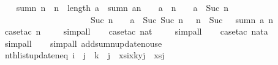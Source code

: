 \begin{isabellebody}
\ \ \isamarkupfalse%
%
\endisatagproof
{\isafoldproof}%
%
\isadelimproof
\isanewline
%
\endisadelimproof
\isanewline
\isanewline
{}\isamarkupfalse%
\ sumn{}{\isacharcolon}\ {\isachardoublequoteopen}n{\isasymge}{}\ {\isasymLongrightarrow}\ n\ {\isasymle}\ length\ a\ {\isasymLongrightarrow}\ sumn\ {\isacharparenleft}a{\isacharbrackleft}n\ {\isacharminus}\ {}\ {\isacharcolon}{\isacharequal}\ a\ {\isacharbang}\ {\isacharparenleft}n\ {\isacharminus}\ {}{\isacharparenright}\ {\isacharplus}\ a\ {\isacharbang}\ Suc\ {\isacharparenleft}n\ {\isacharminus}\ {}{\isacharparenright}{\isacharcomma}\isanewline
\ \ \ \ \ \ \ \ \ \ \ \ \ \ \ \ \ \ \ \ \ Suc\ {\isacharparenleft}n\ {\isacharminus}\ {}{\isacharparenright}\ {\isacharcolon}{\isacharequal}\ a\ {\isacharbang}\ Suc\ {\isacharparenleft}Suc\ {\isacharparenleft}n\ {\isacharminus}\ {}{\isacharparenright}{\isacharparenright}{\isacharbrackright}{\isacharparenright}\ {\isacharparenleft}n\ {\isacharminus}\ Suc\ {}{\isacharparenright}\ {\isacharequal}\ sumn\ a\ n{\isachardoublequoteclose}\isanewline
%
\isadelimproof
\ \ %
\endisadelimproof
%
\isatagproof
{}\isamarkupfalse%
\ {\isacharparenleft}case{\isacharunderscore}tac\ n{\isacharparenright}\isanewline
\ \ \ \isamarkupfalse%
\ simp{\isacharunderscore}all\isanewline
\ \ \isamarkupfalse%
\ {\isacharparenleft}case{\isacharunderscore}tac\ nat{\isacharparenright}\isanewline
\ \ \ \isamarkupfalse%
\ {\isacharparenleft}simp{\isacharunderscore}all{\isacharparenright}\isanewline
\ \ \isamarkupfalse%
\ {\isacharparenleft}case{\isacharunderscore}tac\ nata{\isacharparenright}\isanewline
\ \ \ \isamarkupfalse%
\ {\isacharparenleft}simp{\isacharunderscore}all{\isacharparenright}\isanewline
\ \ \isamarkupfalse%
\ {\isacharparenleft}simp{\isacharunderscore}all\ add{\isacharcolon}sumn{\isacharunderscore}update{\isacharunderscore}no{\isacharunderscore}use{\isacharparenright}\isanewline
\ \ \isamarkupfalse%
%
\endisatagproof
{\isafoldproof}%
%
\isadelimproof
\isanewline
%
\endisadelimproof
\isanewline
{}\isamarkupfalse%
\ nth{\isacharunderscore}list{\isacharunderscore}update{\isacharunderscore}neq{}{\isacharcolon}\ {\isachardoublequoteopen}i\ {\isasymnoteq}\ j\ {\isasymLongrightarrow}\ k\ {\isasymnoteq}\ j\ {\isasymLongrightarrow}\ xs{\isacharbrackleft}i{\isacharcolon}{\isacharequal}x{\isacharcomma}k{\isacharcolon}{\isacharequal}y{\isacharbrackright}{\isacharbang}j\ {\isacharequal}\ xs{\isacharbang}j{\isachardoublequoteclose}\isanewline

\end{isabellebody}
